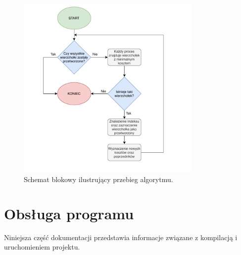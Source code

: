\documentclass[12pt]{article}
\begin{document}
\begin{figure}[H]
\centering
\includegraphics[width=0.8\textwidth]{diagram2.pdf}
\caption{Schemat blokowy ilustrujący przebieg algorytmu.}
\end{figure}

\clearpage
\section{Obsługa programu}
Niniejsza część dokumentacji przedstawia informacje związane z kompilacją i uruchomieniem projektu.
\end{document}
